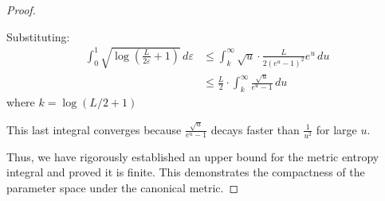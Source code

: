 \documentclass{article}
\begin{document}
\begin{proof}
\begin{enumerate}
    Substituting:
    \begin{align*}
    \int_0^1 \sqrt{\log\left(\frac{L}{2\varepsilon} + 1\right)} \,d\varepsilon
    &\leq \int_k^{\infty} \sqrt{u} \cdot \frac{L}{2(e^u - 1)^2} e^u \,du \\
    &\leq \frac{L}{2} \cdot \int_k^{\infty} \frac{\sqrt{u}}{e^u - 1} \,du
    \end{align*}
    where $k = \log(L/2 + 1)$
    
    This last integral converges because $\frac{\sqrt{u}}{e^u - 1}$ decays faster than $\frac{1}{u^2}$ for large $u$.
\end{enumerate}

Thus, we have rigorously established an upper bound for the metric entropy integral and proved it is finite. This demonstrates the compactness of the parameter space under the canonical metric.
\end{proof}
\end{document}
